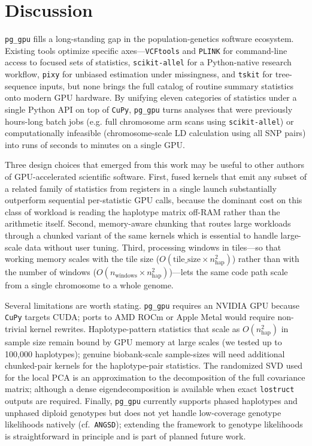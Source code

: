 \documentclass[12pt]{article}
\newcommand{\pggpu}{\texttt{pg\_gpu}\xspace}
\newcommand{\vcftools}{\texttt{VCFtools}\xspace}
\newcommand{\scikitallel}{\texttt{scikit-allel}\xspace}
\newcommand{\pixy}{\texttt{pixy}\xspace}
\newcommand{\plink}{\texttt{PLINK}\xspace}
\newcommand{\angsd}{\texttt{ANGSD}\xspace}
\newcommand{\tskit}{\texttt{tskit}\xspace}
\newcommand{\cupy}{\texttt{CuPy}\xspace}
\newcommand{\lostruct}{\texttt{lostruct}\xspace}
\begin{document}
\section*{Discussion}

\pggpu fills a long-standing gap in the population-genetics software
ecosystem. Existing tools optimize specific axes---\vcftools and
\plink for command-line access to focused sets of statistics,
\scikitallel for a Python-native research workflow, \pixy for
unbiased estimation under missingness, and \tskit for tree-sequence inputs,
but none brings the full catalog of routine summary
statistics onto modern GPU hardware. 
By unifying eleven categories of
statistics under a single Python API on top of \cupy, \pggpu turns
analyses that were previously hours-long batch jobs (e.g. full chromosome arm scans using
\scikitallel) or computationally infeasible
(chromosome-scale LD calculation using all SNP pairs) into runs of seconds to minutes on a single GPU.

Three design choices that emerged from this work may be useful to
other authors of GPU-accelerated scientific software. First, fused
kernels that emit any subset of a related family of statistics from
registers in a single launch substantially outperform sequential
per-statistic GPU calls, because the dominant cost on this class of
workload is reading the haplotype matrix off-RAM rather than the
arithmetic itself. 
Second, memory-aware chunking that
routes large workloads through a
chunked variant of the same kernels which is 
essential to handle large-scale data without user
tuning. Third, processing windows in tiles---so that working memory
scales with the tile size ($O(\text{tile\_size}\times n_{\text{hap}}^2)$)
rather than with the number of windows ($O(n_{\text{windows}}\times n_{\text{hap}}^2)$)---lets
the same code path scale from a single chromosome to a whole genome.

Several limitations are worth stating. \pggpu requires an NVIDIA GPU
because \cupy targets CUDA; ports to AMD ROCm or Apple Metal would
require non-trivial kernel rewrites. Haplotype-pattern statistics
that scale as $O(n_{\text{hap}}^2)$ in sample size remain bound by
GPU memory at large scales (we tested up to 100{,}000 haplotypes);
genuine biobank-scale sample-sizes will need additional chunked-pair
kernels for the haplotype-pair statistics. The randomized SVD
used for the local PCA is an approximation to the
decomposition of the full covariance matrix;
although a dense eigendecomposition is available when exact \lostruct outputs
are required.
Finally, \pggpu currently supports phased haplotypes and unphased
diploid genotypes but does not yet handle low-coverage genotype
likelihoods natively (cf.\ \angsd); extending the framework to
genotype likelihoods is straightforward in principle and is
part of planned future work.
\end{document}
